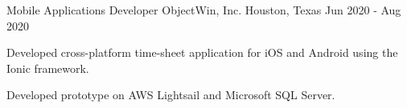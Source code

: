 
\begin{cventries}

  \cventry
        {Mobile Applications Developer} %
	{ObjectWin, Inc.} %
	{Houston, Texas} %
	{Jun 2020 - Aug 2020} %
	{
	\begin{cvitems} %
		\item {Developed cross-platform time-sheet application for iOS and Android using the Ionic framework.}
		\item {Developed prototype on AWS Lightsail and Microsoft SQL Server.}
	\end{cvitems}
	}
    
\end{cventries}

